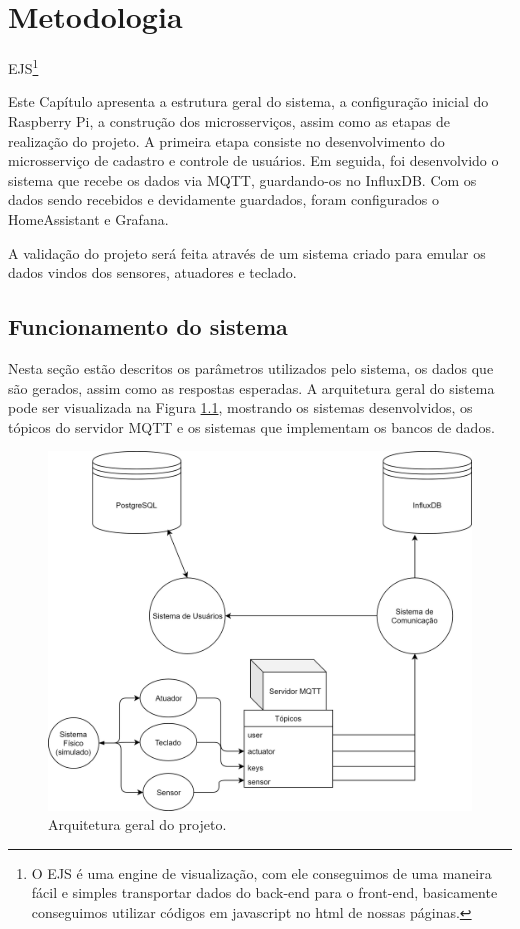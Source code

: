  \chapter{Metodologia}

EJS\footnote{O EJS é uma engine de visualização, com ele conseguimos de uma maneira fácil e simples transportar dados do back-end para o front-end, basicamente conseguimos utilizar códigos em javascript no html de nossas páginas.}

Este Capítulo apresenta a estrutura geral do sistema, a configuração inicial do Raspberry Pi, a construção dos microsserviços, assim como as etapas de realização do projeto. A
primeira etapa consiste no desenvolvimento do microsserviço de cadastro e controle de usuários. Em seguida, foi desenvolvido o sistema que recebe os dados via MQTT, guardando-os no InfluxDB. Com os dados sendo recebidos e devidamente guardados, foram configurados o HomeAssistant e Grafana.

A validação do projeto será feita através de um sistema criado para emular os dados vindos dos sensores, atuadores e teclado.

\section{Funcionamento do sistema} \label{sec:funcionamento}

Nesta seção estão descritos os parâmetros utilizados pelo sistema, os dados que são gerados, assim como as respostas esperadas. A arquitetura geral do sistema pode ser visualizada na Figura \ref{fig:arqgeral}, mostrando os sistemas desenvolvidos, os tópicos do servidor MQTT e os sistemas que implementam os bancos de dados.

\begin{figure}[htbp]
	\centering
	\includegraphics[width=0.7\linewidth]{figuras/ArquiteturaDoProjeto.png}
	\caption{Arquitetura geral do projeto.}
	\label{fig:arqgeral}
\end{figure}

